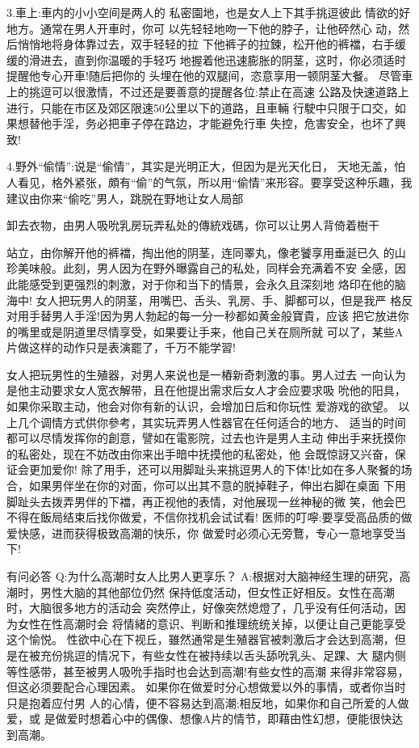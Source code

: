 \documentclass[12pt,UTF8]{ctexbook}
\begin{document}
3.車上:車内的小小空间是两人的
私密園地，也是女人上下其手挑逗彼此
情欲的好地方。通常在男人开車时，你可
以先轻轻地吻一下他的脖子，让他砰然心
动，然后悄悄地将身体靠过去，双手轻轻的拉
下他裤子的拉鍊，松开他的裤襠，右手缓缓的滑进去，直到你温暖的手轻巧
地握着他迅速膨胀的阴茎，这时，你必须适时提醒他专心开車!随后把你的
头埋在他的双腿间，恣意享用一顿阴茎大餐。
尽管車上的挑逗可以很激情，不过还是要善意的提醒各位:禁止在高速
公路及快速道路上进行，只能在市区及郊区限速50公里以下的道路，且車輛
行駛中只限于口交，如果想替他手淫，务必把車子停在路边，才能避免行車
失控，危害安全，也坏了興致!

4.野外“偷情”:说是“偷情”，其实是光明正大，但因为是光天化日，
天地无盖，怕人看见，格外紧张，頗有“偷”的气氛，所以用“偷情”来形容。要享受这种乐趣，我建议由你来“偷吃”男人，跳脱在野地让女人局部

卸去衣物，由男人吸吮乳房玩弄私处的傳統戏碼，你可以让男人背倚着樹干

站立，由你解开他的裤襠，掏出他的阴茎，连同睪丸，像老饕享用垂涎已久
的山珍美味般。此刻，男人因为在野外曝露自己的私处，同样会充满着不安
全感，因此能感受到更强烈的刺激，对于你和当下的情景，会永久且深刻地
烙印在他的脑海中!
女人把玩男人的阴茎，用嘴巴、舌头、乳房、手、脚都可以，但是我严
格反对用手替男人手淫!因为男人勃起的每一分一秒都如黄金般寶貴，应该
把它放进你的嘴里或是阴道里尽情享受，如果要让手来，他自己关在厕所就
可以了，某些A片做这样的动作只是表演罷了，千万不能学習!

女人把玩男性的生殖器，对男人来说也是一樁新奇刺激的事。男人过去
一向认为是他主动要求女人宽衣解带，且在他提出需求后女人才会应要求吸
吮他的阳具，如果你采取主动，他会对你有新的认识，会增加日后和你玩性
爱游戏的欲望。
以上几个调情方式供你參考，其实玩弄男人性器官在任何适合的地方、
适当的时间都可以尽情发挥你的創意，譬如在電影院，过去也许是男人主动
伸出手来抚摸你的私密处，现在不妨改由你来出手暗中抚摸他的私密处，他
会既惊訝又兴奋，保证会更加爱你!
除了用手，还可以用脚趾头来挑逗男人的下体!比如在多人聚餐的场
合，如果男伴坐在你的对面，你可以出其不意的脱掉鞋子，伸出右脚在桌面
下用脚趾头去拨弄男伴的下襠，再正视他的表情，对他展现一丝神秘的微
笑，他会巴不得在飯局结束后找你做爱，不信你找机会试试看!
医师的叮嚀:要享受高品质的做爱快感，进而获得极致高潮的快乐，你
做爱时必须心无旁鶩，专心一意地享受当下!

有问必答
Q:为什么高潮时女人比男人更享乐？
A:根据对大脑神经生理的研究，高潮时，男性大脑的其他部位仍然
保持低度活动，但女性正好相反。女性在高潮时，大脑很多地方的活动会
突然停止，好像突然熄燈了，几乎没有任何活动，因为女性在性高潮时会
将情緒的意识、判断和推理统统关掉，以便让自己更能享受这个愉悦。
性欲中心在下视丘，雖然通常是生殖器官被刺激后才会达到高潮，但
是在被充份挑逗的情况下，有些女性在被持续以舌头舔吮乳头、足踝、大
腿内侧等性感带，甚至被男人吸吮手指时也会达到高潮!有些女性的高潮
来得非常容易，但这必须要配合心理因素。
如果你在做爱时分心想做爱以外的事情，或者你当时只是抱着应付男
人的心情，便不容易达到高潮;相反地，如果你和自己所爱的人做爱，或
是做爱时想着心中的偶像、想像A片的情节，即藉由性幻想，便能很快达
到高潮。
\end{document}
